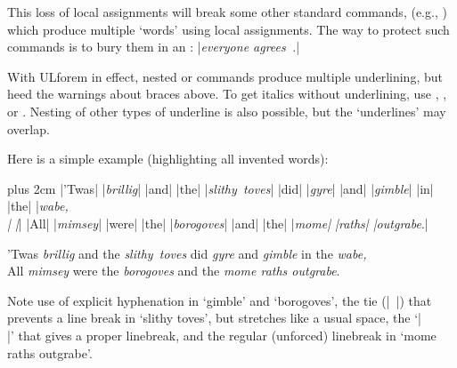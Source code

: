 \documentclass[12pt]{ltxdoc}
\begin{document}
This loss of local assignments will break some other standard commands,
(e.g., ) which produce multiple `words' using local assignments.
The way to protect such commands is to bury them in an :
|\emph{every\-one agrees~\mbox{\cite{you,me}}.}|

With ULforem in effect,
nested  or  commands produce multiple underlining, 
but heed the warnings
about braces above.  To get italics without underlining, use , 
, or .  Nesting
of other types of underline is also possible, but the `underlines' may
overlap.

\medskip
Here is a simple example (highlighting all invented words):\\[4pt]
\begin{minipage}[t]{.58\linewidth}
\ttfamily \rightskip=0pt plus 2cm
|'Twas| |\emph{brillig}| |and| |the| |\emph{slithy~toves}|
|did| |\emph{gyre}| |and| |\emph{gim\-ble}| |in| |the| |\emph{wabe,\\| |}|
|All| |\emph{mim\-sey}| |were| |the| |\emph{boro\-goves}| |and|
|the| |\emph{mome| |raths| |outgrabe}.|
\end{minipage}\hfill
\begin{minipage}[t]{.4\linewidth}
'Twas \emph{brillig} and the \emph{slithy~toves}
did \emph{gyre} and \emph{gim\-ble} in the \emph{wabe,\\ }
All \emph{mim\-sey} were the \emph{boro\-goves} and
the \emph{mome raths out\-grabe}.\par\mbox{}
\end{minipage}\vspace{6pt}
Note use
of explicit hyphenation in `gimble' and `borogoves', the tie (|~|) 
that prevents a line break in `slithy toves', but stretches like a 
usual space, the `|\\|' that gives a proper linebreak, and the regular 
(unforced) linebreak in `mome raths outgrabe'.
\end{document}
